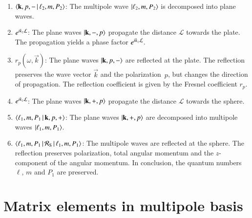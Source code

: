 \begin{enumerate}[label=\protect\circled{\arabic*}]
\item $\braket{\vec k, p, - \, | \, \ell_2,m,P_2}$:
The multipole wave $\Ket{\ell_2,m,P_2}$ is decomposed into plane waves.

\item $\e^{\imag k_z \mathcal{L}}$:
The plane waves $\ket{\vec k, -, p}$ propagate the distance $\mathcal{L}$
towards the plate. The propagation yields a phase factor $\e^{\imag k_z
\mathcal{L}}$.

\item $r_p(\omega,\vec k)$:
The plane waves $\Ket{\vec k, p, -}$ are reflected at the plate. The reflection
preserves the wave vector $\vec k$ and the polarization~$p$, but
changes the direction of propagation. The reflection coefficient is given
by the Fresnel coefficient $r_p$.

\item $\e^{\imag k_z \mathcal{L}}$:
The plane waves $\ket{\vec k, +, p}$ propagate the distance $\mathcal{L}$
towards the sphere.

\item $\braket{\ell_1,m,P_1 \, | \, \vec k, p, +}$:
The plane waves $\ket{\vec k, +, p}$ are decomposed into multipole waves
$\ket{\ell_1,m,P_1}$.

\item $\braket{\ell_1,m,P_1 \, | \, \mathcal{R}_\text{S} \, | \, \ell_1,m,P_1}$:
The multipole waves are reflected at the sphere. The reflection preserves
polarization, total angular momentum and the $z$-component of the angular
momentum. In conclusion, the quantum numbers $\ell$, $m$ and $P_1$ are
preserved.
\end{enumerate}


\section{Matrix elements in multipole basis}

